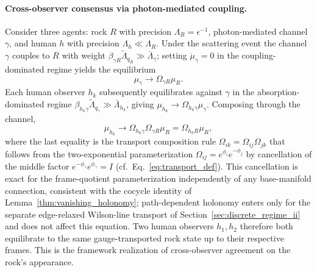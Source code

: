 \documentclass[11pt]{article}
\begin{document}
\paragraph{Cross-observer consensus via photon-mediated coupling.} Consider three agents: rock $R$ with precision $\Lambda_R = \epsilon^{-1}$, photon-mediated channel $\gamma$, and human $h$ with precision $\Lambda_h \ll \Lambda_R$. Under the scattering event the channel $\gamma$ couples to $R$ with weight $\beta_{\gamma R}\tilde{\Lambda}_{q_R} \gg \bar{\Lambda}_\gamma$; setting $\dot{\mu}_\gamma = 0$ in the coupling-dominated regime yields the equilibrium
\begin{equation}
\mu_\gamma \to \Omega_{\gamma R} \mu_R.
\end{equation}
Each human observer $h_k$ subsequently equilibrates against $\gamma$ in the absorption-dominated regime $\beta_{h_k\gamma}\tilde{\Lambda}_{q_\gamma} \gg \bar{\Lambda}_{h_k}$, giving $\mu_{h_k} \to \Omega_{h_k\gamma}\mu_\gamma$. Composing through the channel,
\begin{equation}
\mu_{h_k} \to \Omega_{h_k\gamma} \Omega_{\gamma R} \mu_R = \Omega_{h_k R} \mu_R,
\label{eq:rock_consensus}
\end{equation}
where the last equality is the transport composition rule $\Omega_{ik} = \Omega_{ij}\Omega_{jk}$ that follows from the two-exponential parameterization $\Omega_{ij} = e^{\phi_i}e^{-\phi_j}$ by cancellation of the middle factor $e^{-\phi_\gamma}e^{\phi_\gamma} = I$ (cf.\ Eq.~\eqref{eq:transport_def}). This cancellation is exact for the frame-quotient parameterization independently of any base-manifold connection, consistent with the cocycle identity of Lemma~\ref{thm:vanishing_holonomy}; path-dependent holonomy enters only for the separate edge-relaxed Wilson-line transport of Section~\ref{sec:discrete_regime_ii} and does not affect this equation. Two human observers $h_1, h_2$ therefore both equilibrate to the same gauge-transported rock state up to their respective frames. This is the framework realization of cross-observer agreement on the rock's appearance.
\end{document}
